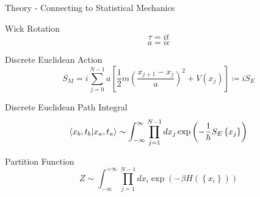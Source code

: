 \documentclass{beamer}
\begin{document}
\begin{frame}{Theory - Connecting to Statistical Mechanics}
    {
        \begin{block}{Wick Rotation}
            {
                \begin{equation}
                     \tau = it
                \end{equation}
            }
            {
                \begin{equation}
                    a = i \epsilon
                \end{equation}
            }
        \end{block}
    }
    {
        \begin{block}{Discrete Euclidean Action}
            {
                \begin{equation}
                    S_{M} = i \sum^{N-1}_{j=0} a \left[\frac{1}{2}m\left(\frac{x_{j+1}-x_j}{a}\right)^2+V\left(x_j\right)\right] \coloneqq iS_E
                \end{equation}
            }
        \end{block}
    }
    {
        \begin{block}{Discrete Euclidean Path Integral}
            {
                \begin{equation}
                    \braket{x_b,t_b|x_a,t_a} \sim \int^{\infty}_{-\infty}\prod^{N-1}_{j=1}dx_{j} \exp{\left(-\frac{1}{\hbar}S_E\left\{x_j\right\}\right)}
                \end{equation}
            }
        \end{block}
    }
    {
        \begin{block}{Partition Function}
            {
                \begin{equation}
                    Z \sim \int^{+\infty}_{-\infty} \prod^{N-1}_{j=1} dx_i \exp{\left(-\beta H\left(\left \{x_i\right \}\right)\right)}
                \end{equation}
            }
        \end{block}
    }
\end{frame}
\end{document}
